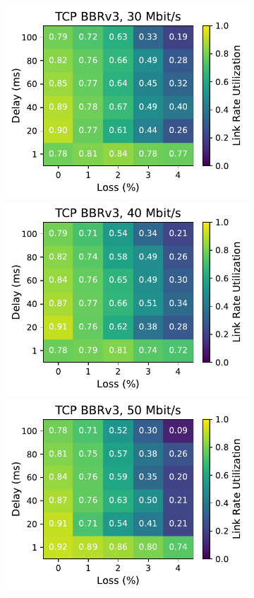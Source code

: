 \begin{figure}[ht]
\begin{subfigure}[b]{0.22\linewidth}
        \includegraphics[width=\linewidth,trim={0 0 2cm 0},clip]{figures/heatmaps/heatmap_tcp_bbr3_30mbps.pdf}
        \includegraphics[width=\linewidth,trim={0 0 2cm 0},clip]{figures/heatmaps/heatmap_tcp_bbr3_40mbps.pdf}
        \includegraphics[width=\linewidth,trim={0 0 2cm 0},clip]{figures/heatmaps/heatmap_tcp_bbr3_50mbps.pdf}

\end{subfigure}
\end{figure}
